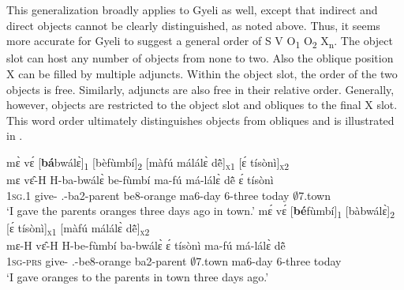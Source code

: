 \noindent This generalization broadly applies to Gyeli as well, except that indirect and direct objects cannot be clearly distinguished, as noted above. Thus, it seems more accurate for Gyeli to suggest a general order of S V O\textsubscript{1} O\textsubscript{2} X\textsubscript{n}. The object slot can host any number of objects from none to two. Also the oblique position X can be filled by multiple adjuncts. Within the object slot, the order of the two objects is free. Similarly,  adjuncts are also  free in their relative order. Generally, however, objects are restricted to the object slot and obliques to the final X slot. This word order ultimately distinguishes objects from obliques and is illustrated in .

\ea\label{objo}
\ea \label{objo1}
  \glll  mɛ̀ vɛ́ [{\bfseries bá}bwálɛ̀]\textsubscript{{\OBJ}1} [bèfùmbí]\textsubscript{{\OBJ}2} [màfú málálɛ̀ dẽ̂]\textsubscript{\textsc{x}1} [ɛ́ tísònì]\textsubscript{\textsc{x}2}  \\
        mɛ vɛ̂-H {\db}H-ba-bwálɛ̀ {\db}be-fùmbí {\db}ma-fú má-lálɛ̀ dẽ̂ ɛ́ tísònì\\
           1\textsc{sg}.{\PST}1 give-{\R} {\db}{\OBJ}.{\LINK}-ba2-parent {\db}be8-orange {\db}ma6-day 6-three today {\LOC} $\emptyset$7.town\\
    \trans `I gave the parents oranges three days ago in town.'
\ex \label{objo2}
  \glll  mɛ́ vɛ́ [{\bfseries bé}fùmbí]\textsubscript{{\OBJ}1} [bàbwálɛ̀]\textsubscript{{\OBJ}2} [ɛ́ tísònì]\textsubscript{\textsc{x}1} [màfú málálɛ̀ dẽ̂]\textsubscript{\textsc{x}2}  \\
       mɛ-H vɛ̂-H {\db}H-be-fùmbí {\db}ba-bwálɛ̀ {\db}ɛ́ tísònì {\db}ma-fú má-lálɛ̀ dẽ̂ \\
         1\textsc{sg}-\textsc{prs} give-{\R} {\db}{\OBJ}.{\LINK}-be8-orange {\db}ba2-parent {\db}{\LOC} $\emptyset$7.town {\db}ma6-day 6-three today\\
    \trans `I gave oranges to the parents in town three days ago.'
\z
\z

